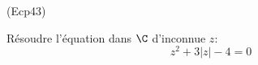 \begin{tiny}(Ecp43)\end{tiny} Résoudre l'équation dans $\C$ d'inconnue $z$:
\begin{displaymath}
 z^2 + 3|z| -4 = 0
\end{displaymath}
